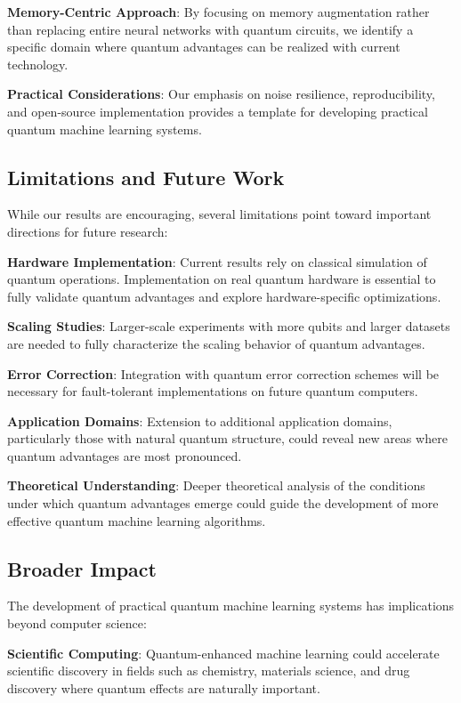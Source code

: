 \textbf{Memory-Centric Approach}: By focusing on memory augmentation rather than replacing entire neural networks with quantum circuits, we identify a specific domain where quantum advantages can be realized with current technology.

\textbf{Practical Considerations}: Our emphasis on noise resilience, reproducibility, and open-source implementation provides a template for developing practical quantum machine learning systems.

\subsection{Limitations and Future Work}

While our results are encouraging, several limitations point toward important directions for future research:

\textbf{Hardware Implementation}: Current results rely on classical simulation of quantum operations. Implementation on real quantum hardware is essential to fully validate quantum advantages and explore hardware-specific optimizations.

\textbf{Scaling Studies}: Larger-scale experiments with more qubits and larger datasets are needed to fully characterize the scaling behavior of quantum advantages.

\textbf{Error Correction}: Integration with quantum error correction schemes will be necessary for fault-tolerant implementations on future quantum computers.

\textbf{Application Domains}: Extension to additional application domains, particularly those with natural quantum structure, could reveal new areas where quantum advantages are most pronounced.

\textbf{Theoretical Understanding}: Deeper theoretical analysis of the conditions under which quantum advantages emerge could guide the development of more effective quantum machine learning algorithms.

\subsection{Broader Impact}

The development of practical quantum machine learning systems has implications beyond computer science:

\textbf{Scientific Computing}: Quantum-enhanced machine learning could accelerate scientific discovery in fields such as chemistry, materials science, and drug discovery where quantum effects are naturally important.

